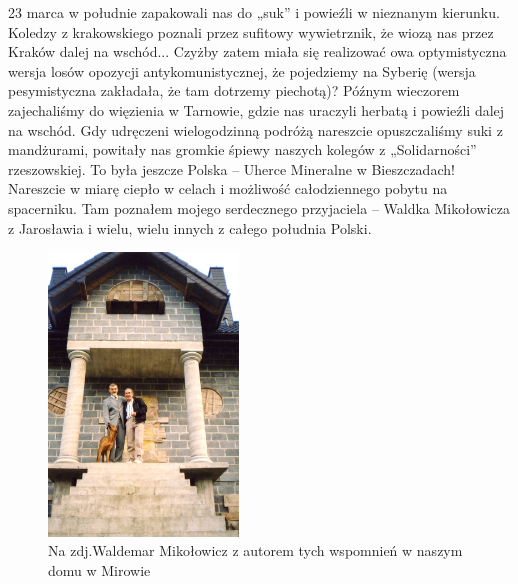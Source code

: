 23 marca w południe zapakowali nas do „suk” i powieźli w nieznanym kierunku. Koledzy z krakowskiego poznali przez sufitowy wywietrznik, że wiozą nas przez Kraków dalej na wschód... Czyżby zatem miała się realizować owa optymistyczna wersja losów opozycji antykomunistycznej, że pojedziemy na Syberię (wersja pesymistyczna zakładała, że tam dotrzemy piechotą)? Późnym wieczorem zajechaliśmy do więzienia w Tarnowie, gdzie nas uraczyli herbatą i powieźli dalej na wschód. Gdy udręczeni wielogodzinną podróżą nareszcie opuszczaliśmy suki z mandżurami, powitały nas gromkie śpiewy naszych kolegów z „Solidarności” rzeszowskiej. To była jeszcze Polska – Uherce Mineralne w Bieszczadach! Nareszcie w miarę ciepło w celach i możliwość całodziennego pobytu na spacerniku. Tam poznałem mojego serdecznego przyjaciela – Waldka Mikołowicza z Jarosławia i wielu, wielu innych z całego południa Polski.
\begin{figure}[!h]
\begin{center}
\includegraphics[width=0.45\textwidth]{photo/waldemar_mikolowicz_1.jpg}
\caption[Waldemar Mikołowicz z Czesławem Świerczyńskim w Mirowie]{Na zdj.Waldemar Mikołowicz z autorem tych wspomnień w naszym domu w  Mirowie}
\end{center}
\end{figure}

